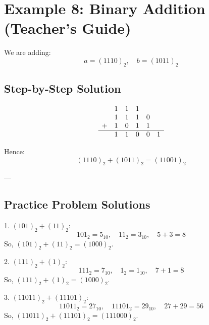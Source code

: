 \documentclass[12pt]{article}
\begin{document}
\section*{Example 8: Binary Addition (Teacher’s Guide)}

We are adding:
\[
a = (1110)_2, \quad b = (1011)_2
\]

\subsection*{Step-by-Step Solution}
\[
\begin{array}{cccccc}
   & 1 & 1 & 1 &  \\
   & 1 & 1 & 1 & 0 \\
 + & 1 & 0 & 1 & 1 \\
\hline
   & 1 & 1 & 0 & 0 & 1
\end{array}
\]

Hence:
\[
(1110)_2 + (1011)_2 = (11001)_2
\]

---

\subsection*{Practice Problem Solutions}

1. $(101)_2 + (11)_2$:  
   \[
   101_2 = 5_{10}, \quad 11_2 = 3_{10}, \quad 5 + 3 = 8
   \]  
   So, $(101)_2 + (11)_2 = (1000)_2$.

2. $(111)_2 + (1)_2$:  
   \[
   111_2 = 7_{10}, \quad 1_2 = 1_{10}, \quad 7 + 1 = 8
   \]  
   So, $(111)_2 + (1)_2 = (1000)_2$.

3. $(11011)_2 + (11101)_2$:  
   \[
   11011_2 = 27_{10}, \quad 11101_2 = 29_{10}, \quad 27 + 29 = 56
   \]  
   So, $(11011)_2 + (11101)_2 = (111000)_2$.
\end{document}
